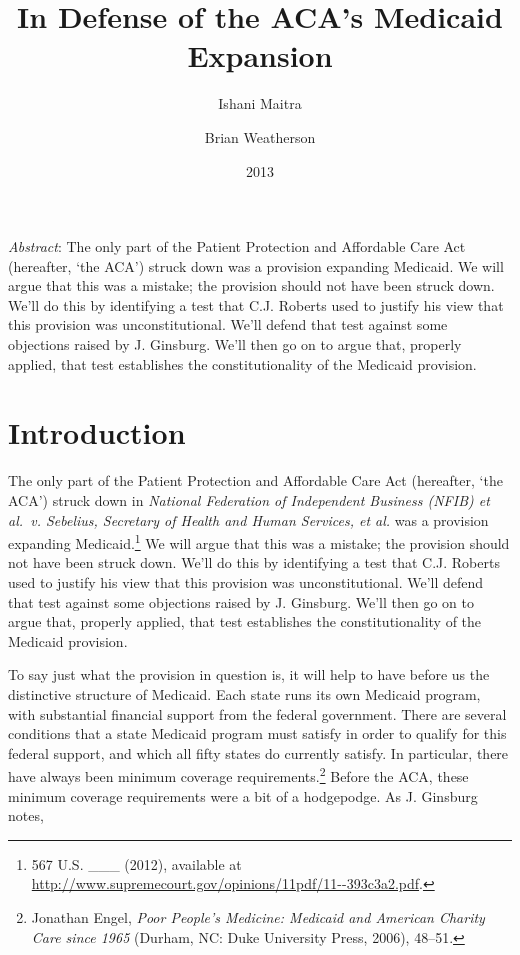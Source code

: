 \documentclass[
  11pt,
  letterpaper,
  DIV=11,
  numbers=noendperiod,
  twoside]{scrartcl}
\title{In Defense of the ACA's Medicaid Expansion}
\author{Ishani Maitra \and Brian Weatherson}
\date{2013}
\renewenvironment{abstract}
 {\vspace{-1.25cm}
 \quotation\small\noindent\emph{Abstract}:}
 {\endquotation}
\begin{document}
\maketitle
\begin{abstract}
The only part of the Patient Protection and Affordable Care Act
(hereafter, `the ACA') struck down was a provision expanding Medicaid.
We will argue that this was a mistake; the provision should not have
been struck down. We'll do this by identifying a test that C.J. Roberts
used to justify his view that this provision was unconstitutional. We'll
defend that test against some objections raised by J. Ginsburg. We'll
then go on to argue that, properly applied, that test establishes the
constitutionality of the Medicaid provision.
\end{abstract}


\section{Introduction}\label{introduction}

The only part of the Patient Protection and Affordable Care Act
(hereafter, `the ACA') struck down in \emph{National Federation of
Independent Business (NFIB) et al.~v. Sebelius, Secretary of Health and
Human Services, et al.} was a provision expanding Medicaid.\footnote{567
  U.S. \_\_\_ (2012), available at
  \url{http://www.supremecourt.gov/opinions/11pdf/11--393c3a2.pdf}.} We
will argue that this was a mistake; the provision should not have been
struck down. We'll do this by identifying a test that C.J. Roberts used
to justify his view that this provision was unconstitutional. We'll
defend that test against some objections raised by J. Ginsburg. We'll
then go on to argue that, properly applied, that test establishes the
constitutionality of the Medicaid provision.

To say just what the provision in question is, it will help to have
before us the distinctive structure of Medicaid. Each state runs its own
Medicaid program, with substantial financial support from the federal
government. There are several conditions that a state Medicaid program
must satisfy in order to qualify for this federal support, and which all
fifty states do currently satisfy. In particular, there have always been
minimum coverage requirements.\footnote{Jonathan Engel, \emph{Poor
  People's Medicine: Medicaid and American Charity Care since 1965}
  (Durham, NC: Duke University Press, 2006), 48--51.} Before the ACA,
these minimum coverage requirements were a bit of a hodgepodge. As J.
Ginsburg notes,
\end{document}
